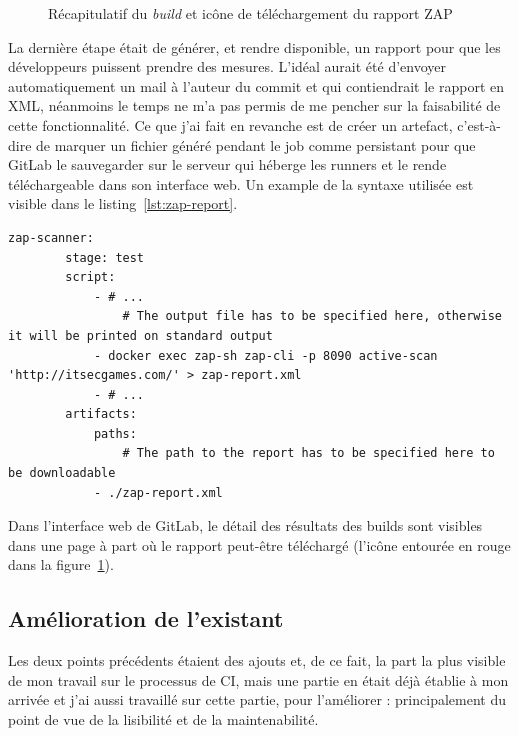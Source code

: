 \begin{figure}[h]
	\centering
	\caption{Récapitulatif du \textit{build} et icône de téléchargement du rapport ZAP}
	\label{fig:gitlab_build_recap}
\end{figure}

La dernière étape était de générer, et rendre disponible, un rapport pour que les développeurs puissent prendre des mesures. L'idéal aurait été d'envoyer automatiquement un mail à l'auteur du commit et qui contiendrait le rapport en XML, néanmoins le temps ne m'a pas permis de me pencher sur la faisabilité de cette fonctionnalité. Ce que j'ai  fait en revanche est de créer un artefact, c'est-à-dire de marquer un fichier généré pendant le job comme persistant pour que GitLab le sauvegarder sur le serveur qui héberge les runners et le rende téléchargeable dans son interface web. Un example de la syntaxe utilisée est visible dans le listing~\ref{lst:zap-report}.

\begin{minipage}{\linewidth}
	\begin{lstlisting}[caption={Extrait de code qui lance un scanner ZAP en ligne de commande et rend le rapport disponible sur GitLab},label={lst:zap-report}]
		zap-scanner:
		stage: test
		script:
			- # ...
				# The output file has to be specified here, otherwise it will be printed on standard output
			- docker exec zap-sh zap-cli -p 8090 active-scan 'http://itsecgames.com/' > zap-report.xml 
			- # ...
		artifacts:
			paths:
				# The path to the report has to be specified here to be downloadable 
			- ./zap-report.xml
	\end{lstlisting}
\end{minipage}

Dans l'interface web de GitLab, le détail des résultats des builds sont visibles dans une page à part où le rapport peut-être téléchargé (l'icône entourée en rouge dans la figure~\ref{fig:gitlab_build_recap}).

\subsection{Amélioration de l'existant}
Les deux points précédents étaient des ajouts et, de ce fait, la part la plus visible de mon travail sur le processus de CI, mais une partie en était déjà établie à mon arrivée et j'ai aussi travaillé sur cette partie, pour l'améliorer : principalement du point de vue de la lisibilité et de la maintenabilité.

